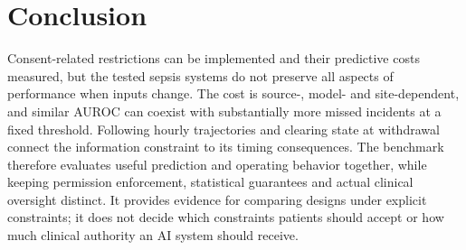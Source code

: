 \section*{Conclusion}
Consent-related restrictions can be implemented and their predictive costs measured, but the tested sepsis systems do not preserve all aspects of performance when inputs change. The cost is source-, model- and site-dependent, and similar AUROC can coexist with substantially more missed incidents at a fixed threshold. Following hourly trajectories and clearing state at withdrawal connect the information constraint to its timing consequences. The benchmark therefore evaluates useful prediction and operating behavior together, while keeping permission enforcement, statistical guarantees and actual clinical oversight distinct. It provides evidence for comparing designs under explicit constraints; it does not decide which constraints patients should accept or how much clinical authority an AI system should receive.
